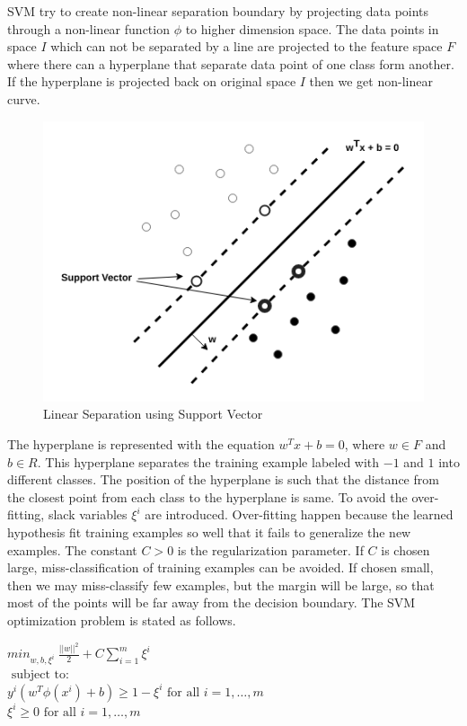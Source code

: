\documentclass[10pt,oneside,a4paper]{article}
\begin{document}
SVM try to create non-linear separation boundary by projecting data points through a non-linear function $\phi$ to higher dimension space. The data points in space $I$ which can not be separated by a line are projected to the feature space $F$ where there can a hyperplane that separate data point of one class form another. If the hyperplane is projected back on original space $I$ then we get non-linear curve.\cite{svm}

\begin{figure}[H]
\centering
\includegraphics[scale=0.5]{SVM}
\caption{Linear Separation using Support Vector} \label{fig:SVM}
\end{figure}

The hyperplane is represented with the equation $w^{T}x + b = 0$, where $w \in F$ and $b \in R$. This hyperplane separates the training example labeled with $-1$ and $1$ into different classes. The position of the hyperplane is such that the distance from the closest point from each class to the hyperplane is same. To avoid the over-fitting, slack variables $\xi^{i}$ are introduced. Over-fitting happen because the learned hypothesis fit training examples so well that it fails to generalize the new examples. The constant $C > 0$ is the regularization parameter. If $C$ is chosen large, miss-classification of training examples can be avoided. If chosen small, then we may miss-classify few examples, but the margin will be large, so that most of the points will be far away from the decision boundary. The SVM optimization problem is stated as follows.\cite{svm} \cite{svm-ml}

\begin{center}
  ${min}_{w,b,\xi^i} \ \frac{||w||^2}{2} + C \sum_{i=1}^m \xi^i$ \\
  $\mbox{ subject to: }$ \\
  $y^i( w^T \phi(x^i) + b) \geq 1 - \xi^i \mbox{ for all } i = 1, \dots, m$ \\
  \hspace{3cm} $\xi^i \geq 0 \mbox{ for all } i = 1, \dots, m$ \\
\end{center}
\end{document}
